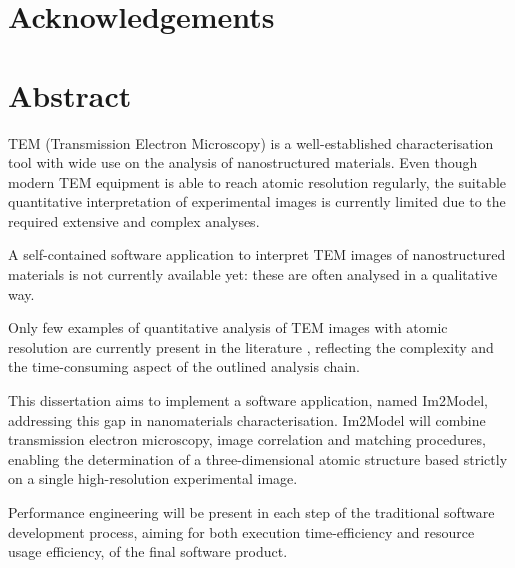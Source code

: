 \documentclass[
  oneside,
  11pt, a4paper,
  footinclude=true,
  headinclude=true,
  cleardoublepage=empty
]{scrbook}
\author{Filipe Costa Oliveira}
\date{\myear} %
\begin{document}
	\umfrontcover	
	\umtitlepage
	
	\chapter*{Acknowledgements}


	\chapter*{Abstract}
	
	
	
	TEM (Transmission Electron Microscopy) is a well-established characterisation tool with wide use on
the analysis of nanostructured materials. Even though modern TEM equipment is able to reach atomic
resolution regularly, the suitable quantitative interpretation of experimental images is currently limited
due to the required extensive and complex analyses.\par 

A self-contained software application to interpret TEM images of nanostructured materials is not currently available yet: these are often analysed in a qualitative way.



Only few examples of quantitative analysis of TEM images with atomic resolution are
currently present in the literature%
, reflecting the complexity and the time-consuming aspect of the
outlined analysis chain.\par 


This dissertation aims to implement a software application, named Im2Model, addressing this gap in nanomaterials
characterisation. Im2Model will combine transmission electron microscopy, image correlation and matching procedures, enabling the determination of a three-dimensional atomic structure based strictly on a single high-resolution experimental image.\par 
Performance engineering will be present in each step of the traditional software development process, 
aiming for 
both execution time-efficiency and resource usage efficiency, of the final software product.
\end{document}

